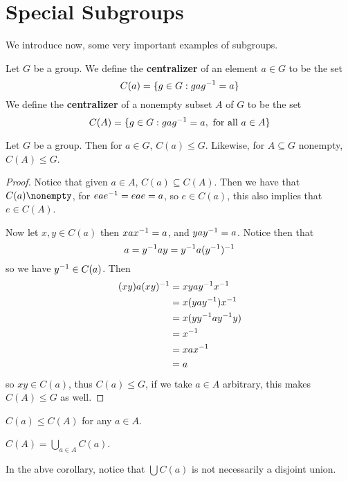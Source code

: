 \section{Special Subgroups}
\label{section_2.2}

We introduce now, some very important examples of subgroups.

\begin{definition}
  Let $G$ be a group. We define the \textbf{centralizer} of an element $a \in
  G$ to be the set
  \begin{equation*}
    C(a)=\{g \in G: gag^{-1}=a\}
  \end{equation*}
  We define the
  \textbf{centralizer} of a nonempty subset $A$ of  $G$ to be the set
  \begin{equation*}
    C(A)=\{g \in G : gag^{-1}=a, \text{ for all } a \in A\}
  \end{equation*}
\end{definition}

\begin{lemma}\label{lemma_2.2.1}
  Let $G$ be a group. Then for  $a \in G$,  $C(a) \leq G$. Likewise, for $A
  \subseteq G$ nonempty, $C(A) \leq G$.
\end{lemma}
\begin{proof}
  Notice that given $a \in A$,  $C(a) \subseteq C(A)$. Then we have that $C(a)
  \nonempty$, for $eae^{-1}=eae=a$, so $e \in C(a)$, this also implies that
  $e \in C(A)$.

  Now let $x,y \in C(a)$ then $xax^{-1}=a$, and $yay^{-1}=a$. Notice then
  that
  \begin{equation*}
    a=y^{-1}ay=y^{-1}a(y^{-1})^{-1}
  \end{equation*}
  so we have $y^{-1} \in C(a)$.
  Then
  \begin{align*}
    (xy)a(xy)^{-1} &=  xyay^{-1}x^{-1} \\
                    &=  x(yay^{-1})x^{-1} \\
                    &=  x(yy^{-1}ay^{-1}y)  \\
                    &=  x^{-1} \\
                    &=  xax^{-1} \\
                    &=  a
  \end{align*}
  so $xy \in C(a)$, thus $C(a) \leq G$, if we take $a
  \in A$ arbitrary, this makes  $C(A) \leq G$ as well.
\end{proof}
\begin{corollary}
  $C(a) \leq C(A)$ for any $a \in A$.
\end{corollary}
\begin{corollary}
  $C(A)=\bigcup_{a \in A}{C(a)}$.
\end{corollary}
\begin{remark}
  In the abve corollary, notice that $\bigcup{C(a)}$ is not necessarily a
  disjoint union.
\end{remark}

